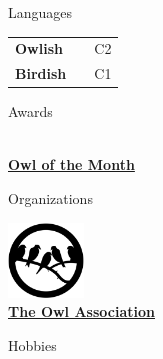 \documentclass[darkstylish]{stylishcv} %
\begin{document}
	\begin{darkshadedcvbox}Languages\end{darkshadedcvbox}
	\begin{tabular}{l l R{0.4cm}}
		\hspace{-0.45cm}\textbf{Owlish}  &  &\hspace{-0.1cm} C2\\
		\hspace{-0.45cm}\textbf{Birdish} &  \hspace{-0.2cm} & \hspace{-0.1cm}C1\\
	\end{tabular}
	\smallskip

	\begin{darkshadedcvbox}Awards\end{darkshadedcvbox}
	{\footnotesize
		\begin{center}
			\href{}{\Huge {\color{headercolour}\faInstitution}}\\[\baselineskip]\href{https://google.com}{\bfseries Owl of the Month}
		\end{center}}
			\smallskip

	\begin{darkshadedcvbox}Organizations\end{darkshadedcvbox}
	{\footnotesize
	\begin{center}
		\href{}{\includegraphics[width=2cm]{resources/bird-badge.png}}\\[\baselineskip]	\href{https://google.com}{\bfseries The Owl Association}
	\end{center}}
	\smallskip


	\begin{darkshadedcvbox}Hobbies\end{darkshadedcvbox}
	\begin{center}
		\\
	\end{center}
\end{document}
